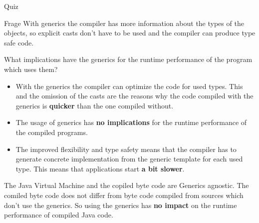 \documentclass[pdf,9pt,aspectratio=169]{beamer}
\begin{document}
\begin{frame}{Quiz}
    \begin{block}{Frage}
        With generics the compiler has more information about the 
        types of the objects, so explicit casts don't have to be used 
        and the compiler can produce type safe code.

        What implications have the generics for the runtime 
        performance of the  program which uses them?
    \end{block}

    \begin{overprint}
      \begin{itemize}
      \item With the generics the compiler can optimize the code for 
        used types. This and the omission of the casts are the 
        reasons why the code compiled with the generics is 
        \textbf{quicker} than the one compiled without.
      \item The usage of generics has \textbf{no implications} for 
        the runtime performance of the compiled programs.
      \item The improved flexibility and type safety means that the 
        compiler has to generate concrete implementation from 
        the generic template for each used type. This means 
        that applications start \textbf{a bit slower}.
      \end{itemize}
      The Java Virtual Machine and the copiled byte code are Generics 
      agnostic. The comiled byte code does not differ from byte code 
      compiled from sources which don't use the generics.
      So using the generics has \textbf{no impact} on the runtime 
      performance of compiled Java code.
    \end{overprint}

  \end{frame}
  
\end{document}
